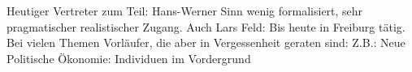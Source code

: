 Heutiger Vertreter zum Teil: Hans-Werner Sinn wenig formalisiert, sehr pragmatischer realistischer Zugang. Auch Lars Feld: Bis heute in Freiburg tätig.
Bei vielen Themen Vorläufer, die aber in Vergessenheit geraten sind: Z.B.: Neue Politische Ökonomie: Individuen im Vordergrund

